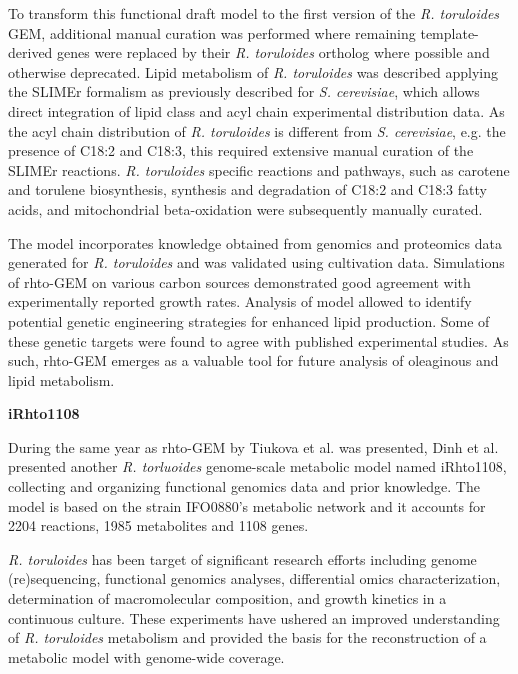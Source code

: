 To transform this functional draft model to the first version of the \textit{R. toruloides} GEM, additional 
manual curation was performed where remaining template-derived genes were replaced by their \textit{R. toruloides} 
ortholog where possible and otherwise deprecated. Lipid metabolism of \textit{R. toruloides} was described applying 
the SLIMEr formalism as previously described for \textit{S. cerevisiae}, which allows direct 
integration of lipid class and acyl chain experimental distribution data. As the acyl chain distribution of 
\textit{R. toruloides} is different from \textit{S. cerevisiae}, e.g. the presence of C18:2 and C18:3, this required extensive manual curation of the SLIMEr reactions. 
\textit{R. toruloides} specific reactions and pathways, such as carotene and torulene biosynthesis, synthesis 
and degradation of C18:2 and C18:3 fatty acids, and mitochondrial beta-oxidation were subsequently 
manually curated. \cite{Tiukova2019}

The model incorporates knowledge obtained from genomics and proteomics data generated for
\textit{R. toruloides} and was validated using cultivation data. Simulations of rhto-GEM on 
various carbon sources demonstrated good agreement with experimentally reported growth rates. 
Analysis of model allowed to identify potential genetic engineering strategies for enhanced lipid production. 
Some of these genetic targets were found to agree with published experimental studies. 
As such, rhto-GEM emerges as a valuable tool for future analysis of oleaginous and lipid 
metabolism. \cite{Tiukova2019}


\textbf{iRhto1108}

During the same year as rhto-GEM by Tiukova et al. \cite{Tiukova2019} was presented, Dinh et al. \cite{Dinh2019} presented another \textit{R. torluoides} 
genome-scale metabolic model named iRhto1108, collecting and organizing functional genomics data
\cite{Coradetti2018} and prior knowledge. The model is based on the strain IFO0880's metabolic network and it accounts for 2204 reactions, 1985 metabolites and 1108 genes. 

\textit{R. toruloides} has been target of significant research efforts
including genome (re)sequencing, functional genomics analyses, differential omics characterization, determination of macromolecular composition, and growth
kinetics in a continuous culture. These experiments have ushered an improved understanding of \textit{R. toruloides}
metabolism and provided the basis for the reconstruction of a metabolic
model with genome-wide coverage. \cite{Dinh2019}

